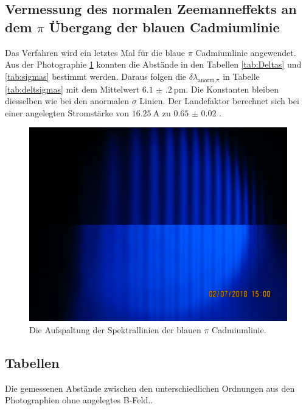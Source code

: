 \subsection{\texorpdfstring{Vermessung des normalen Zeemanneffekts an dem $\pi$ Übergang der blauen Cadmiumlinie}{Vermessung des normalen Zeemanneffekts an dem pi Übergang der blauen Cadmiumlinie}}

Das Verfahren wird ein letztes Mal für die blaue $\pi$ Cadmiumlinie angewendet. Aus der Photographie \ref{fig:anormal2} konnten die Abstände in den Tabellen \ref{tab:Deltas} und \ref{tab:sigmas} bestimmt werden. Daraus folgen die $\delta\lambda_{\text{anorm,}\pi}$ in Tabelle \ref{tab:deltsigmas} mit dem Mittelwert $\SI{6.1(2)}{\pico\meter}$. Die Konstanten bleiben diesselben wie bei den anormalen $\sigma$ Linien. Der Landefaktor berechnet sich bei einer angelegten Stromstärke von $\SI{16.25}{\ampere}$ %
zu $\num{0.65(2)}$ .

\begin{figure}
	\centering
	\includegraphics[width=\linewidth-130pt,height=\textheight-130pt,keepaspectratio]{./content/Images/pianormalB0und1.JPG}
	\caption{Die Aufspaltung der Spektrallinien der blauen $\pi$ Cadmiumlinie.}
	\label{fig:anormal2}
\end{figure}


\subsection{Tabellen}

\begin{table}
	\centering
	\caption{Die gemessenen Abstände zwischen den unterschiedlichen Ordnungen aus den Photographien ohne angelegtes B-Feld..}
	
	\label{tab:Deltas}
\end{table}


